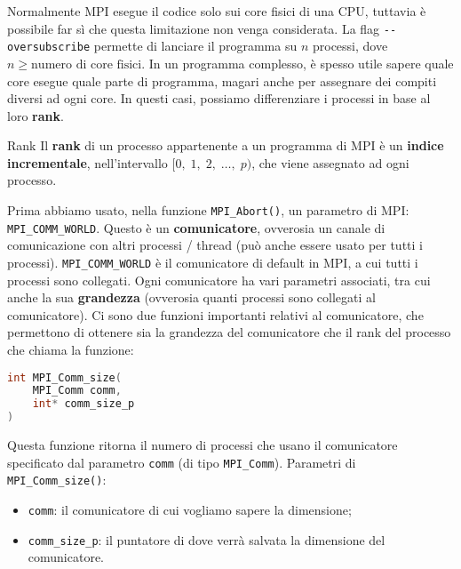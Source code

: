 Normalmente MPI esegue il codice solo sui core fisici di una CPU, tuttavia è possibile far sì che questa limitazione non venga considerata. La flag \verb|--oversubscribe| permette di lanciare il programma su $n$ processi, dove $n \geq \text{numero di core fisici}$.
\nl
In un programma complesso, è spesso utile sapere quale core esegue quale parte di programma, magari anche per assegnare dei compiti diversi ad ogni core. In questi casi, possiamo differenziare i processi in base al loro \textbf{rank}.

\begin{definition}{Rank}
    Il \textbf{rank} di un processo appartenente a un programma di MPI è un \textbf{indice incrementale}, nell'intervallo $[0, \; 1, \; 2, \; \dots , \; p)$, che viene assegnato ad ogni processo.
\end{definition}

Prima abbiamo usato, nella funzione \verb|MPI_Abort()|, un parametro di MPI: \verb|MPI_COMM_WORLD|. Questo è un \textbf{comunicatore}, ovverosia un canale di comunicazione con altri processi / thread (può anche essere usato per tutti i processi). \verb|MPI_COMM_WORLD| è il comunicatore di default in MPI, a cui tutti i processi sono collegati. Ogni comunicatore ha vari parametri associati, tra cui anche la sua \textbf{grandezza} (ovverosia quanti processi sono collegati al comunicatore). Ci sono due funzioni importanti relativi al comunicatore, che permettono di ottenere sia la grandezza del comunicatore che il rank del processo che chiama la funzione:

\begin{codedefine}
    \begin{lstlisting}[language = C, numbers = none]
int MPI_Comm_size(
    MPI_Comm comm,
    int* comm_size_p
)\end{lstlisting}
    \manlower
    Questa funzione ritorna il numero di processi che usano il comunicatore specificato dal parametro \verb|comm| (di tipo \verb|MPI_Comm|).
    \nl
    Parametri di \verb|MPI_Comm_size()|:
    \begin{itemize}
        \item \verb|comm|: il comunicatore di cui vogliamo sapere la dimensione;
        \item \verb|comm_size_p|: il puntatore di dove verrà salvata la dimensione del comunicatore.
    \end{itemize}
\end{codedefine}

